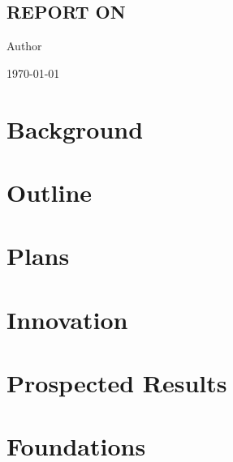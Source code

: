 \documentclass{elsarticle}
\renewcommand{\title}[1]{\begin{center}\section*{\large #1}\end{center}}
\newcommand{\textcenter}[1]{\begin{center}#1\end{center}}
\begin{document}
\title{REPORT ON}
\textcenter{Author}
\textcenter{\today}

\section{Background}

\section{Outline}

\section{Plans}

\section{Innovation}

\section{Prospected Results}

\section{Foundations}
\end{document}

